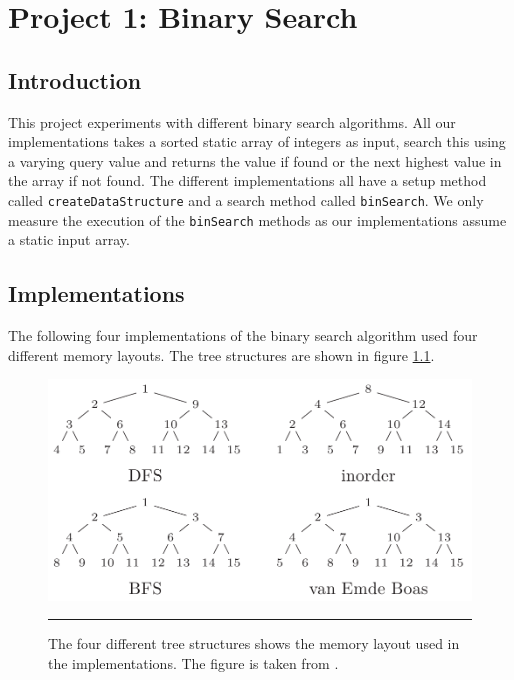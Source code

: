 
\chapter{Project 1: Binary Search} %

\label{Chapter1} %



\section{Introduction}
This project experiments with different binary search algorithms. All our implementations takes a sorted static array of integers as input, search
this using a varying query value and returns the value if found or the next highest value in the array if not found.
The different implementations all have a setup method called \verb!createDataStructure! and a search method called \verb!binSearch!.
We only measure the execution of the \verb!binSearch! methods as our implementations assume a static input array.

\section{Implementations}
The following four implementations of the binary search algorithm used four different memory layouts. The tree structures are shown in figure \ref{fig:memory_layouts}.

\begin{figure}[htbp]
	\centering
		\includegraphics[width=\textwidth]{./Figures/Project1/MemoryLayouts.png}
		\rule{35em}{0.5pt}
	\caption[Memory layouts]{
	The four different tree structures shows the memory layout used in the implementations. The figure is taken from \citep{binAlg}.
	}
	\label{fig:memory_layouts}
\end{figure}


